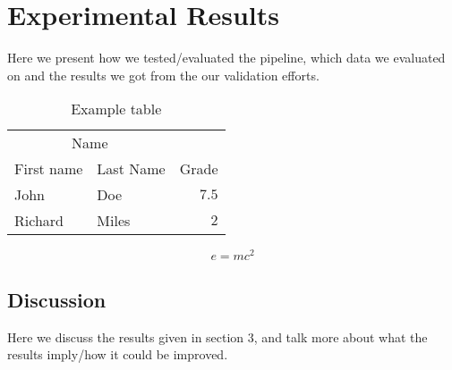 \section{Experimental Results}
Here we present how we tested/evaluated the pipeline, which data we evaluated on and the results we got from the our validation efforts.
\begin{table}[H]
\caption{Example table}
\centering
\begin{tabular}{llr}
\toprule
\multicolumn{2}{c}{Name} \\
\cmidrule(r){1-2}
First name & Last Name & Grade \\
\midrule
John & Doe & $7.5$ \\
Richard & Miles & $2$ \\
\bottomrule
\end{tabular}
\end{table}



\begin{equation}
\label{eq:emc}
e = mc^2
\end{equation}



\subsection{Discussion}
Here we discuss the results given in section 3, and talk more about what the results imply/how it could be improved.